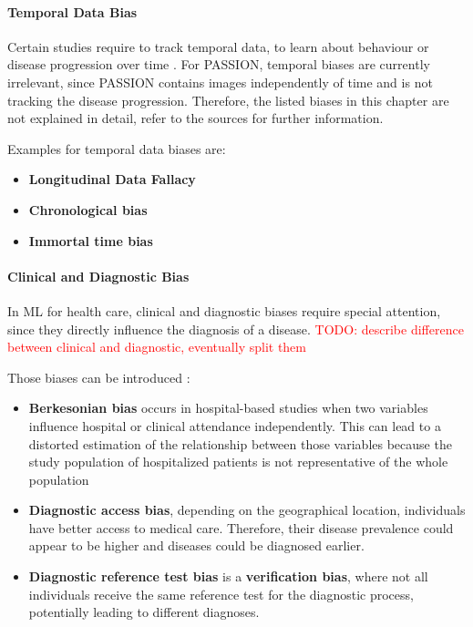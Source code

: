\documentclass[12pt, a4paper, oneside]{book}   	%
\renewcommand{\todo}[1]{\textcolor{red}{TODO: #1}}
\begin{document}
			\paragraph{Temporal Data Bias}
			Certain studies require to track temporal data, to learn about behaviour or disease progression over time \autocite{Mehrabi_2021}. For PASSION, temporal biases are currently irrelevant, since PASSION contains images independently of time and is not tracking the disease progression. Therefore, the listed biases in this chapter are not explained in detail, refer to the sources for further information.
			
			Examples for temporal data biases are:
			\begin{itemize}
				\item \textbf{Longitudinal Data Fallacy} \autocite{Mehrabi_2021}
				\item \textbf{Chronological bias} \autocite{Chakraborty_2024, c9, c13}
				\item \textbf{Immortal time bias} \autocite{Chakraborty_2024, c24, c20}
			\end{itemize}
			
			
			
			\paragraph{Clinical and Diagnostic Bias \autocite{Chakraborty_2024}}
			In ML for health care, clinical and diagnostic biases require special attention, since they directly influence the diagnosis of a disease.
			\todo{describe difference between clinical and diagnostic, eventually split them}
			
			Those biases can be introduced :
			\begin{itemize}
				\item \textbf{Berkesonian bias} occurs in hospital-based studies when two variables influence hospital or clinical attendance independently. This can lead to a distorted estimation of the relationship between those variables because the study population of hospitalized patients is not representative of the whole population \autocite{Chakraborty_2023, c3, c7}
				\item \textbf{Diagnostic access bias}, depending on the geographical location, individuals have better access to medical care. Therefore, their disease prevalence could appear to be higher and diseases could be diagnosed earlier. \autocite{Chakraborty_2024}
				\item \textbf{Diagnostic reference test bias} is a \textbf{verification bias}, where not all individuals receive the same reference test for the diagnostic process, potentially leading to different diagnoses. \autocite{Chakraborty_2024, c21}
			\end{itemize}
			
\end{document}
